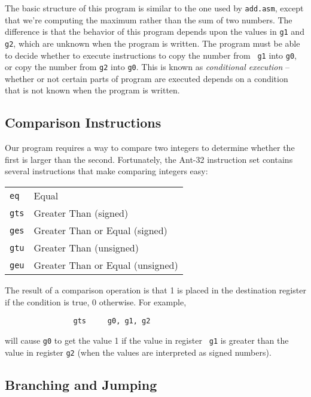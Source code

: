 The basic structure of this program is similar to the one used by
{\tt add.asm}, except that we're computing the maximum rather than the
sum of two numbers.  The difference is that the behavior of this
program depends upon the values in {\tt g1} and {\tt g2}, which are
unknown when the program is written.  The program must be able to
decide whether to execute instructions to copy the number from {\tt
g1} into {\tt g0}, or copy the number from {\tt g2} into {\tt g0}. 
This is known as {\em conditional execution} -- whether or not certain
parts of program are executed depends on a condition that is not known
when the program is written.

\subsection{Comparison Instructions}

Our program requires a way to compare two integers to determine
whether the first is larger than the second.  Fortunately, the
Ant-32 instruction set contains several instructions that make
comparing integers easy:

\vspace{3mm}
\begin{center}
\begin{tabular}{|l|l|}
\hline
{\tt eq}  & Equal \\
{\tt gts} & Greater Than (signed) \\
{\tt ges} & Greater Than or Equal (signed) \\
{\tt gtu} & Greater Than (unsigned) \\
{\tt geu} & Greater Than or Equal (unsigned) \\
\hline
\end{tabular}
\end{center}
\vspace{3mm}

The result of a comparison operation is that 1 is placed in the
destination register if the condition is true, 0 otherwise.
For example,

        \begin{verbatim}
                gts     g0, g1, g2
        \end{verbatim}

will cause {\tt g0} to get the value 1 if the value in register {\tt
g1} is greater than the value in register {\tt g2} (when the values
are interpreted as signed numbers).

\subsection{Branching and Jumping}

